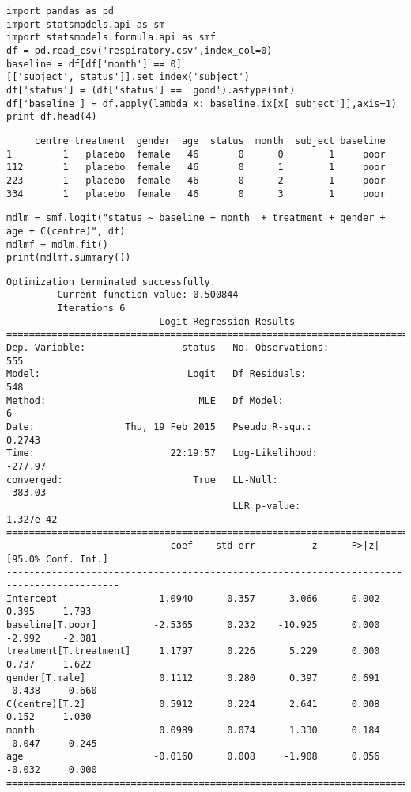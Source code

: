 \documentclass[12pt,fleqn]{article}\usepackage{../common}
\begin{document}
\begin{verbatim}
import pandas as pd
import statsmodels.api as sm
import statsmodels.formula.api as smf
df = pd.read_csv('respiratory.csv',index_col=0)
baseline = df[df['month'] == 0][['subject','status']].set_index('subject')
df['status'] = (df['status'] == 'good').astype(int)
df['baseline'] = df.apply(lambda x: baseline.ix[x['subject']],axis=1)
print df.head(4)
\end{verbatim}

\begin{verbatim}
     centre treatment  gender  age  status  month  subject baseline
1         1   placebo  female   46       0      0        1     poor
112       1   placebo  female   46       0      1        1     poor
223       1   placebo  female   46       0      2        1     poor
334       1   placebo  female   46       0      3        1     poor
\end{verbatim}

\begin{verbatim}
mdlm = smf.logit("status ~ baseline + month  + treatment + gender + age + C(centre)", df)
mdlmf = mdlm.fit()
print(mdlmf.summary())
\end{verbatim}

\begin{verbatim}
Optimization terminated successfully.
         Current function value: 0.500844
         Iterations 6
                           Logit Regression Results                           
==============================================================================
Dep. Variable:                 status   No. Observations:                  555
Model:                          Logit   Df Residuals:                      548
Method:                           MLE   Df Model:                            6
Date:                Thu, 19 Feb 2015   Pseudo R-squ.:                  0.2743
Time:                        22:19:57   Log-Likelihood:                -277.97
converged:                       True   LL-Null:                       -383.03
                                        LLR p-value:                 1.327e-42
==========================================================================================
                             coef    std err          z      P>|z|      [95.0% Conf. Int.]
------------------------------------------------------------------------------------------
Intercept                  1.0940      0.357      3.066      0.002         0.395     1.793
baseline[T.poor]          -2.5365      0.232    -10.925      0.000        -2.992    -2.081
treatment[T.treatment]     1.1797      0.226      5.229      0.000         0.737     1.622
gender[T.male]             0.1112      0.280      0.397      0.691        -0.438     0.660
C(centre)[T.2]             0.5912      0.224      2.641      0.008         0.152     1.030
month                      0.0989      0.074      1.330      0.184        -0.047     0.245
age                       -0.0160      0.008     -1.908      0.056        -0.032     0.000
==========================================================================================
\end{verbatim}
\end{document}
